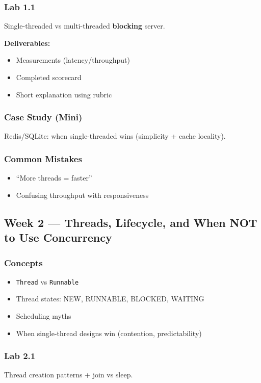 \documentclass[11pt,a4paper]{article}
\begin{document}
	\subsubsection*{Lab 1.1}
	Single-threaded vs multi-threaded \textbf{blocking} server.
	
	\textbf{Deliverables:}
	\begin{itemize}[leftmargin=*]
		\item Measurements (latency/throughput)
		\item Completed scorecard
		\item Short explanation using rubric
	\end{itemize}
	
	\subsubsection*{Case Study (Mini)}
	Redis/SQLite: when single-threaded wins (simplicity + cache locality).
	
	\subsubsection*{Common Mistakes}
	\begin{itemize}[leftmargin=*]
		\item ``More threads = faster''
		\item Confusing throughput with responsiveness
	\end{itemize}
	
	\subsection*{Week 2 --- Threads, Lifecycle, and When NOT to Use Concurrency}
	
	\subsubsection*{Concepts}
	\begin{itemize}[leftmargin=*]
		\item \texttt{Thread} vs \texttt{Runnable}
		\item Thread states: NEW, RUNNABLE, BLOCKED, WAITING
		\item Scheduling myths
		\item When single-thread designs win (contention, predictability)
	\end{itemize}
	
	\subsubsection*{Lab 2.1}
	Thread creation patterns + join vs sleep.
	
\end{document}
